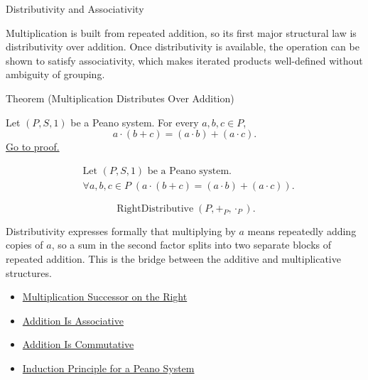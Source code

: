 \begin{topicbox}{Distributivity and Associativity}
\begin{exposition}
Multiplication is built from repeated addition, so its first major structural
law is distributivity over addition. Once distributivity is available, the
operation can be shown to satisfy associativity, which makes iterated products
well-defined without ambiguity of grouping.
\end{exposition}

\begin{theorembox}{Theorem (Multiplication Distributes Over Addition)}
\begin{theorem}
\label{thm:multiplication-distributes-over-addition}
Let $(P,S,1)$ be a Peano system. For every $a,b,c \in P$,
\[
a \cdot (b+c) = (a \cdot b) + (a \cdot c).
\]
\hyperref[prf:multiplication-distributes-over-addition]{Go to proof.}
\end{theorem}
\end{theorembox}

\begin{remark*}
\[
\begin{aligned}
&\text{Let } (P,S,1) \text{ be a Peano system.}\\
&\forall a,b,c \in P\;(a \cdot (b+c) = (a \cdot b) + (a \cdot c)).
\end{aligned}
\]
\end{remark*}

\begin{remark*}
\[
\operatorname{RightDistributive}(P,+_P,\cdot_P).
\]
\end{remark*}

\begin{remark*}[Interpretation]
Distributivity expresses formally that multiplying by $a$ means repeatedly
adding copies of $a$, so a sum in the second factor splits into two separate
blocks of repeated addition. This is the bridge between the additive and
multiplicative structures.
\end{remark*}

\begin{dependencies}
\begin{itemize}
  \item \hyperref[thm:multiplication-successor-on-right]{Multiplication Successor on the Right}
  \item \hyperref[thm:addition-associative]{Addition Is Associative}
  \item \hyperref[thm:addition-commutative]{Addition Is Commutative}
  \item \hyperref[thm:induction-principle-for-peano-system]{Induction Principle for a Peano System}
\end{itemize}
\end{dependencies}


\end{topicbox}
